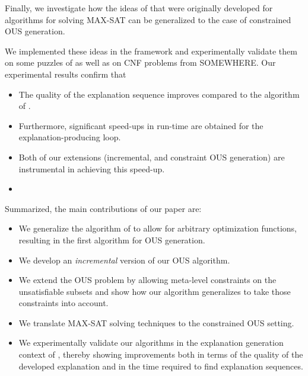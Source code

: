 Finally, we investigate how the ideas of \citet{davies} that were originally developed for \hitsetbased algorithms for solving MAX-SAT can be generalized to the case of constrained OUS generation. 

We implemented these ideas in the  framework \cite{cppy}  and experimentally validate them on some puzzles of \citet{ecai/BogaertsGCG20} as well as on CNF problems from SOMEWHERE.
Our experimental results confirm that 
\begin{itemize}
  \item The quality of the explanation sequence improves compared to the algorithm of \citet{ecai/BogaertsGCG20}. 
  \item Furthermore, significant speed-ups in run-time are obtained for the explanation-producing loop. 
  \item Both of our extensions (incremental, and constraint OUS generation) are instrumental in achieving this speed-up. 
  \item {}
\end{itemize}





Summarized, the main contributions of our paper are:
\begin{itemize}
  \item We generalize the algorithm of \citet{ignatiev2015smallest} to allow for arbitrary  optimization functions, resulting in the first algorithm for OUS generation.
  \item We develop an \emph{incremental} version of our OUS algorithm. 
  \item We extend the OUS problem by allowing meta-level constraints on the unsatisfiable subsets and show how our algorithm generalizes to take those constraints into account. 
  \item We translate MAX-SAT solving techniques to the constrained OUS setting.
  \item We experimentally validate our algorithms in the explanation generation context of \citet{ecai/BogaertsGCG20}, thereby showing improvements both in terms of the quality of the developed explanation and in the time required to find explanation sequences.
\end{itemize}



